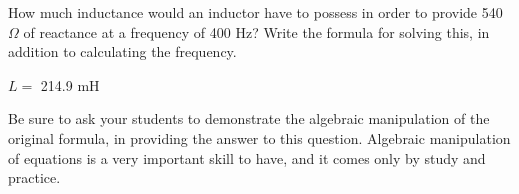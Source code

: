 

How much inductance would an inductor have to possess in order to provide 540 $\Omega$ of reactance at a frequency of 400 Hz?  Write the formula for solving this, in addition to calculating the frequency.







$L =$ 214.9 mH







Be sure to ask your students to demonstrate the algebraic manipulation of the original formula, in providing the answer to this question.  Algebraic manipulation of equations is a very important skill to have, and it comes only by study and practice.





